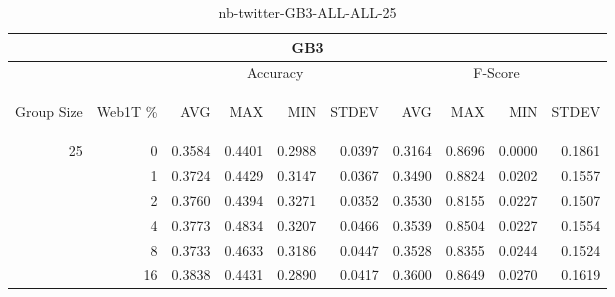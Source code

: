 \begin{center}
\begin{table}[htbp]
\begin{center}
\begin{tabular}{ | r | r | r | r | r | r | r | r | r | r |}
\hline
\multicolumn{10}{|c|}{GB3}\\
\hline
 & & \multicolumn{4}{|c|}{Accuracy} & \multicolumn{4}{|c|}{F-Score}\\ \cline{3-10}
\begin{sideways}Group Size\end{sideways} & \begin{sideways}Web1T \%\end{sideways} & \begin{sideways}AVG\end{sideways} & \begin{sideways}MAX\end{sideways} & \begin{sideways}MIN\end{sideways} & \begin{sideways}STDEV\end{sideways} & \begin{sideways}AVG\end{sideways} & \begin{sideways}MAX\end{sideways} & \begin{sideways}MIN\end{sideways} & \begin{sideways}STDEV\end{sideways}\\
\hline
\multirow{5}{*}{25}
 & 0 & 0.3584 & 0.4401 & 0.2988 & 0.0397 & 0.3164 & 0.8696 & 0.0000 & 0.1861\\ \cline{2-10}
 & 1 & 0.3724 & 0.4429 & 0.3147 & 0.0367 & 0.3490 & 0.8824 & 0.0202 & 0.1557\\ \cline{2-10}
 & 2 & 0.3760 & 0.4394 & 0.3271 & 0.0352 & 0.3530 & 0.8155 & 0.0227 & 0.1507\\ \cline{2-10}
 & 4 & 0.3773 & 0.4834 & 0.3207 & 0.0466 & 0.3539 & 0.8504 & 0.0227 & 0.1554\\ \cline{2-10}
 & 8 & 0.3733 & 0.4633 & 0.3186 & 0.0447 & 0.3528 & 0.8355 & 0.0244 & 0.1524\\ \cline{2-10}
 & 16 & 0.3838 & 0.4431 & 0.2890 & 0.0417 & 0.3600 & 0.8649 & 0.0270 & 0.1619\\ \cline{2-10}
\hline
\end{tabular}
\caption{nb-twitter-GB3-ALL-ALL-25}
\label{table:nb-twitter-GB3-ALL-ALL-25}
\end{center}
\end{table}
\end{center}

